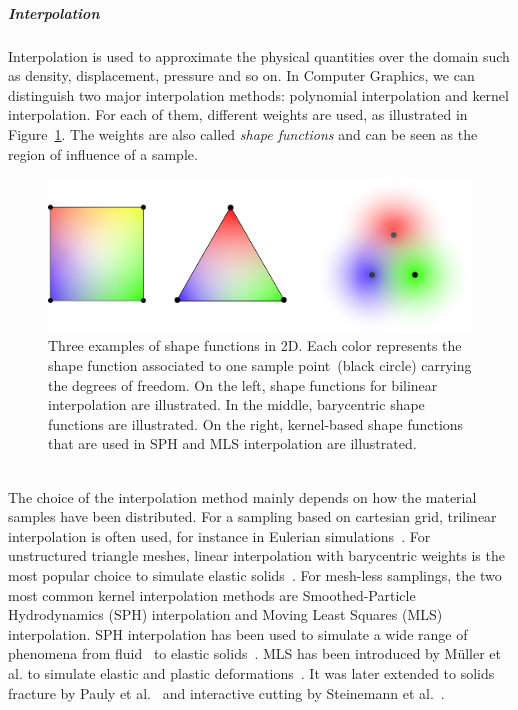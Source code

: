 \subparagraph{Interpolation}
Interpolation is used to approximate the physical quantities over the domain such as density, displacement, pressure and so on. 
In Computer Graphics, we can distinguish two major interpolation methods: polynomial interpolation and kernel interpolation.
For each of them, different weights are used, as illustrated in Figure~\ref{fig:shapefunction}. The weights are also called \emph{shape functions} and can be seen as the region of influence of a sample.
\begin{figure}[!h]
	\centering
	\includegraphics[width=\linewidth]{images/continuum_mechanics/shapefunction.png}
	\caption[STAR mechanics: Shape functions]{\label{fig:shapefunction} 
		Three examples of shape functions in 2D. 
		Each color represents the shape function associated to one sample point~(black circle) carrying the degrees of freedom. 
		On the left, shape functions for bilinear interpolation are illustrated. 
		In the middle, barycentric shape functions are illustrated. 
		On the right, kernel-based shape functions that are used in SPH and MLS interpolation are illustrated.}
\end{figure}
\\
The choice of the interpolation method mainly depends on how the material samples have been distributed. 
For a sampling based on cartesian grid, trilinear interpolation is often used, for instance in Eulerian simulations~\cite{Bridson2008}. 
For unstructured triangle meshes, linear interpolation with barycentric weights is the most popular choice to simulate elastic solids~\cite{Muller2008}.
For mesh-less samplings, the two most common kernel interpolation methods are Smoothed-Particle Hydrodynamics (SPH) interpolation and Moving Least Squares (MLS) interpolation.
SPH interpolation has been used to simulate a wide range of phenomena from fluid~\cite{Desbrun1999} to elastic solids~\cite{Becker2009}.
MLS has been introduced by M\"{u}ller et al. to simulate elastic and plastic deformations~\cite{Muller2004:melting}.
It was later extended to solids fracture by Pauly et al.~\cite{Pauly2005} and interactive cutting by Steinemann et al.~\cite{Steinemann2009}.
